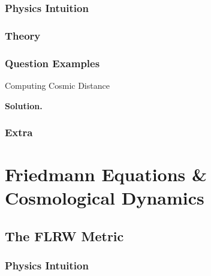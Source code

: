 \documentclass[12pt, a4paper, openright]{report}
\begin{document}
\subsection{Physics Intuition}

\begin{intuition}
\lipsum[5][1-3]   %
\end{intuition}

\subsection{Theory}

\begin{theory}
\lipsum[6][1-5]   %
\end{theory}

\subsection{Question Examples}

\begin{example}{Computing Cosmic Distance}{}
\lipsum[7][1-2]   %

\medskip\textbf{Solution.}\quad
\lipsum[7][3-4]   %
\end{example}

\subsection{Extra}

\begin{extra}
\lipsum[8][1-2]   %
\end{extra}

\clearpage

\chapter{Friedmann Equations \& Cosmological Dynamics}

\section{The FLRW Metric}

\subsection{Physics Intuition}
\end{document}
